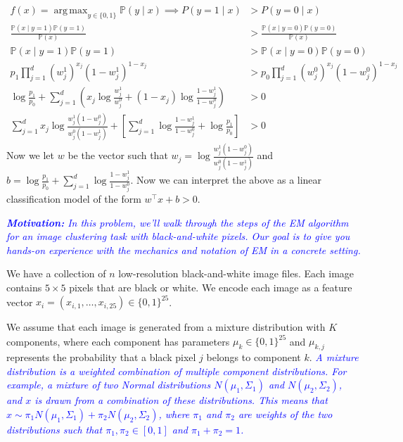 \documentclass{article}
\renewcommand{\P}{\mathbb{P}}
\DeclareMathOperator*{\argmax}{arg\,max}
\begin{document}
\begin{probset}
\begin{prob}
\begin{subprobset}
\begin{subprob}
            \begin{soln}
                \begin{align*}
                    f(x) = \argmax_{y\in\{0,1\}} \P(y\mid x) \implies P(y=1\mid x) &> P(y=0\mid x) \\
                    \frac{\P(x \mid y = 1)\P(y=1)}{\P(x)} &> \frac{\P(x \mid y = 0)\P(y=0)}{\P(x)} \\
                    \P(x \mid y = 1)\P(y=1) &> \P(x \mid y = 0)\P(y=0) \\
                    p_1 \prod_{j=1}^d (w^1_j)^{x_j} (1 - w^1_j)^{1 - x_j} &> p_0 \prod_{j=1}^d (w^0_j)^{x_j} (1 - w^0_j)^{1 - x_j} \\
                    \log{\frac{p_1}{p_0}} + \sum_{j=1}^d \left( x_j \log{\frac{w^1_j}{w^0_j}} + (1 - x_j) \log{\frac{1 - w^1_j}{1 - w^0_j}} \right) &> 0 \\
                    \sum_{j=1}^d x_j \log{\frac{w^1_j(1 - w^0_j)}{w^0_j(1 - w^1_j)}} + \left[ \sum_{j=1}^d \log{\frac{1 - w^1_j}{1 - w^0_j}} + \log{\frac{p_1}{p_0}} \right] &> 0
                \end{align*}
                Now we let $w$ be the vector such that $w_j = \log{\frac{w^1_j(1 - w^0_j)}{w^0_j(1 - w^1_j)}}$ and $b = \log{\frac{p_1}{p_0}} + \sum_{j=1}^d \log{\frac{1 - w^1_j}{1 - w^0_j}}$. Now we can interpret the above as a linear classification model of the form $w^\top x + b > 0$.
            \end{soln}
        \end{subprob}
    \end{subprobset}
\end{prob}

\newpage
\begin{prob}
    \textit{\textcolor{blue}{\textbf{Motivation:} In this problem, we'll walk through the steps of the EM algorithm for an image clustering task with black-and-white pixels. Our goal is to give you hands-on experience with the mechanics and notation of EM in a concrete setting.}}

    We have a collection of $n$ low-resolution black-and-white image files. Each image contains $5 \times 5$ pixels that are black or white. We encode each image as a feature vector $x_i = (x_{i,1}, \ldots, x_{i,25}) \in \{0, 1\}^{25}$.

    We assume that each image is generated from a mixture distribution with $K$ components, where each component has parameters $\mu_k \in \{0, 1\}^{25}$ and $\mu_{k,j}$ represents the probability that a black pixel $j$ belongs to component $k$. \textit{\textcolor{blue}{A mixture distribution is a weighted combination of multiple component distributions. For example, a mixture of two Normal distributions $N (\mu_1, \Sigma_1)$ and $N (\mu_2, \Sigma_2)$, and $x$ is drawn from a combination of these distributions. This means that $x \sim \pi_1 N (\mu_1, \Sigma_1) + \pi_2 N (\mu_2, \Sigma_2)$, where $\pi_1$ and $\pi_2$ are weights of the two distributions such that $\pi_1, \pi_2 \in [0, 1]$ and $\pi_1 + \pi_2 = 1$.}}


\end{prob}
\end{probset}
\end{document}

